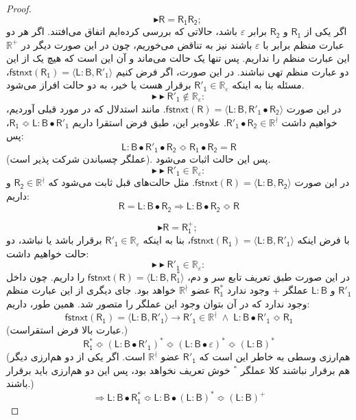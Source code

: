 \begin{proof}
	
	$$\blacktriangleright\mathsf{R=R_1 R_2;\:}$$
	اگر یکی از $\mathsf{R_1}$ و $\mathsf{R_2}$ برابر $\varepsilon$ باشد، حالاتی که بررسی کرده‌ایم اتفاق می‌افتند. اگر هر دو عبارت منظم برابر با $\varepsilon$ باشند نیز به تناقض می‌خوریم، چون در این صورت دیگر در $\mathbb{R^+}$ این عبارت منظم را نداریم. پس تنها یک حالت می‌ماند و آن این است که هیچ یک از این دو عبارت منظم تهی نباشند. در این صورت، اگر فرض کنیم 
	$\mathsf{fstnxt(R_1)=\langle L:B , R'_1 \rangle}$،
	مسئله بنا به اینکه 
	$\mathsf{R'_1} \in \mathbb{R_\varepsilon}$
	برقرار هست یا خیر، به دو حالت افراز می‌شود.
	$$\blacktriangleright\blacktriangleright \mathsf{R'_1} \notin \mathbb{R_\varepsilon}: $$
	در این صورت 
	$\mathsf{fstnxt(R)=\langle L:B , R'_1 \bullet R_2}\rangle$.
	مانند استدلال که در مورد قبلی آوردیم، خواهیم داشت 
	$\mathsf{R'_1 \bullet R_2 \in } \mathbb{R^\nmid}$.
	علاوه‌بر این، طبق فرض استقرا داریم 
	$\mathsf{ R_1 \Bumpeq L:B \bullet R'_1 }$،
	پس:
	$$\mathsf{L:B \bullet R'_1 \bullet R_2 \Bumpeq R_1 \bullet R_2 = R}$$
	(عملگر چسباندن شرکت پذیر است). پس این حالت اثبات می‌شود.
	$$\blacktriangleright\blacktriangleright \mathsf{R'_1} \in \mathbb{R_\varepsilon}: $$
	در این صورت 
	$\mathsf{fstnxt(R)=\langle L:B , R_2 \rangle}$.
	مثل حالت‌های قبل ثابت می‌شود که $\mathsf{R_2} \in \mathbb{R^\nmid}$ و داریم:
	$$\mathsf{R = L:B \bullet R_2 \Rightarrow L:B \bullet R_2 \Bumpeq R}$$ 
	
	$$\blacktriangleright\mathsf{R=R_1^+;\:}$$
	با فرض اینکه 
	$\mathsf{fstnxt(R_1)=\langle L:B , R'_1 \rangle}$،
		بنا به اینکه 
	$\mathsf{R'_1} \in \mathbb{R_\varepsilon}$
	برقرار باشد یا نباشد، دو حالت خواهیم داشت:
	$$\blacktriangleright\blacktriangleright\mathsf{R'_1} \in \mathbb{R_\varepsilon}:$$
	در این صورت طبق تعریف تابع سر و دم،
	$\mathsf{fstnxt(R)=\langle L:B , R^*_1 \rangle}$
	را داریم. 
 چون  داخل 
	$\mathsf{R'_1}$
	و 
	$\mathsf{L:B}$
	عملگر $+$ وجود ندارد 	$\mathsf{R_1^*}$
	عضو 
	$\mathbb{R^\nmid}$ 
	خواهد بود. جای دیگری از این عبارت منظم وجود ندارد که در آن بتوان وجود این عملگر را متصور شد. همین طور، داریم:
	$$\mathsf{fstnxt(R_1) = \langle L:B , R'_1 \rangle \rightarrow
		R'_1 \in \mathbb{R^\nmid}\; \land \; L:B \bullet R'_1 \Bumpeq R_1}$$
		(عبارت بالا فرض استقراست.)
	$$\mathsf{R_1^* \Bumpeq (L:B \bullet R'_1)^* \Bumpeq (L:B \bullet \varepsilon)^* \Bumpeq (L:B)^*}$$
	(هم‌ارزی وسطی به خاطر این است که $\mathsf{R'_1}$ عضو $\mathbb{R^\nmid}$ است. اگر یکی از دو هم‌ارزی‌ دیگر هم برقرار نباشند کلا عملگر $ ^*$ خوش تعریف نخواهد بود، پس این دو هم‌ارزی باید برقرار باشند.)
	$$\Rightarrow \mathsf{L:B\bullet R_1^* \Bumpeq L:B \bullet (L:B)^* \Bumpeq 
	(L:B)^+}$$


\end{proof}
